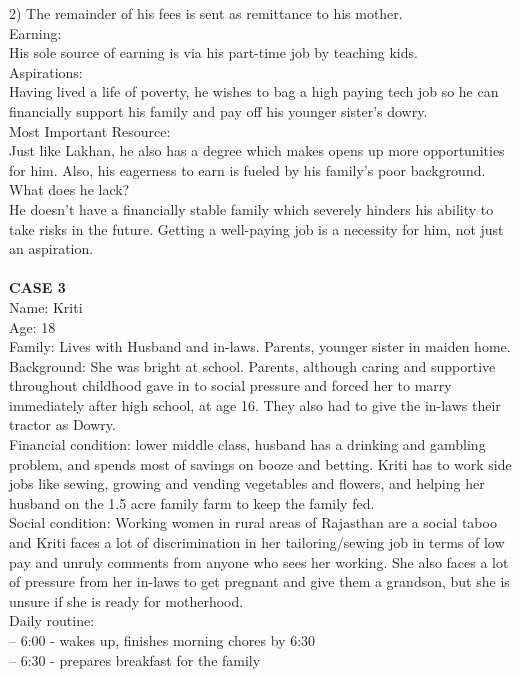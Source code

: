 \documentclass{article}
\begin{document}
2) The remainder of his fees is sent as remittance to his mother.\\
Earning:\\
His sole source of earning is via his part-time job by teaching kids.\\
Aspirations:\\
Having lived a life of poverty, he wishes to bag a high paying tech job so he can financially support his family and pay off his younger sister's dowry.\\
Most Important Resource:\\
Just like Lakhan, he also has a degree which makes opens up more opportunities for him. Also, his eagerness to earn is fueled by his family's poor background.\\
What does he lack?\\
He doesn't have a financially stable family which severely hinders his ability to take risks in the future. Getting a well-paying job is a necessity for him, not just an aspiration. \\\\
\newpage
\textbf{CASE 3}\\
Name: Kriti\\
Age: 18\\
Family: Lives with Husband and in-laws. Parents, younger sister in
maiden home.\\
Background: She was bright at school. Parents, although caring and
supportive throughout childhood gave in to social pressure and forced her
to marry immediately after high school, at age 16. They also had to give
the in-laws their tractor as Dowry.\\
Financial condition: lower middle class, husband has a drinking and gambling problem, and spends most of savings on booze and betting. Kriti has
to work side jobs like sewing, growing and vending vegetables and flowers,
and helping her husband on the 1.5 acre family farm to keep the family
fed.\\
Social condition: Working women in rural areas of Rajasthan are a social
taboo and Kriti faces a lot of discrimination in her tailoring/sewing job in
terms of low pay and unruly comments from anyone who sees her working.
She also faces a lot of pressure from her in-laws to get pregnant and give
them a grandson, but she is unsure if she is ready for motherhood.\\
Daily routine:\\
– 6:00 - wakes up, finishes morning chores by 6:30\\
– 6:30 - prepares breakfast for the family\\
\end{document}
